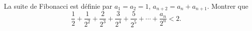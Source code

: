La suite de Fibonacci est définie par $a_1 = a_2 = 1$, $a_{n+2} = a_n + a_{n+1}$. Montrer que
\[ \frac{1}{2} + \frac{1}{2^2} + \frac{2}{2^3} + \frac{3}{2^4} + \frac{5}{2^5} + \cdots + \frac{a_n}{2^n} < 2. \]
